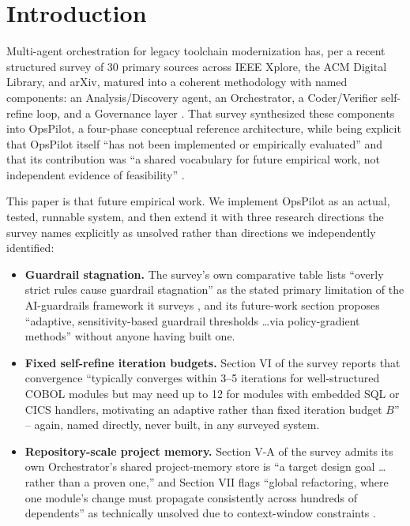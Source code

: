\documentclass[conference]{IEEEtran}
\begin{document}
\section{Introduction}

Multi-agent orchestration for legacy toolchain modernization has, per a
recent structured survey of 30 primary sources across IEEE Xplore, the ACM
Digital Library, and arXiv, matured into a coherent methodology with named
components: an Analysis/Discovery agent, an Orchestrator, a Coder/Verifier
self-refine loop, and a Governance layer \cite{survey}. That survey
synthesized these components into OpsPilot, a four-phase conceptual reference
architecture, while being explicit that OpsPilot itself ``has not been
implemented or empirically evaluated'' and that its contribution was ``a
shared vocabulary for future empirical work, not independent evidence of
feasibility'' \cite{survey}.

This paper is that future empirical work. We implement OpsPilot as an
actual, tested, runnable system, and then extend it with three research
directions the survey names explicitly as unsolved rather than directions we
independently identified:

\begin{itemize}
\item \textbf{Guardrail stagnation.} The survey's own comparative table lists
``overly strict rules cause guardrail stagnation'' as the stated primary
limitation of the AI-guardrails framework it surveys \cite{survey}, and its
future-work section proposes ``adaptive, sensitivity-based guardrail
thresholds \ldots via policy-gradient methods'' without anyone having built
one.
\item \textbf{Fixed self-refine iteration budgets.} Section VI of the survey
reports that convergence ``typically converges within 3--5 iterations for
well-structured COBOL modules but may need up to 12 for modules with embedded
SQL or CICS handlers, motivating an adaptive rather than fixed iteration
budget $B$'' \cite{survey} -- again, named directly, never built, in any
surveyed system.
\item \textbf{Repository-scale project memory.} Section V-A of the survey
admits its own Orchestrator's shared project-memory store is ``a target
design goal \ldots rather than a proven one,'' and Section VII flags
``global refactoring, where one module's change must propagate consistently
across hundreds of dependents'' as technically unsolved due to context-window
constraints \cite{survey}.
\end{itemize}
\end{document}
